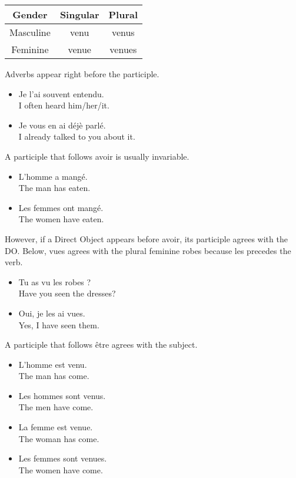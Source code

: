 \begin{center}\begin{tabular}{|c|c|c|}
\hline
\textbf{Gender} & \textbf{Singular} & \textbf{Plural} \\ \hline
Masculine       & venu              & venus           \\ \hline
Feminine        & venue             & venues          \\ \hline
\end{tabular}\end{center}

Adverbs appear right before the participle.

\begin{itemize}
  \item  Je l'ai souvent entendu. \\ I often heard him/her/it.
	\item  Je vous en ai d{\'e}j{\`e} parl{\'e}. \\ I already talked to you about it.
\end{itemize}

A participle that follows avoir is usually invariable.

\begin{itemize}
  \item  L'homme a mang{\'e}. \\ The man has eaten.
	\item  Les femmes ont mang{\'e}. \\ The women have eaten.
\end{itemize}

However, if a Direct Object appears before avoir, its participle agrees with the DO. Below, vues agrees with the plural feminine robes because les precedes the verb.

\begin{itemize}
  \item  Tu as vu les robes ? \\ Have you seen the dresses?
	\item  Oui, je les ai vues. \\ Yes, I have seen them.
\end{itemize}

A participle that follows {\^e}tre agrees with the subject.

\begin{itemize}
  \item  L'homme est venu. \\ The man has come.
	\item  Les hommes sont venus. \\ The men have come.
	\item  La femme est venue. \\ The woman has come.
	\item  Les femmes sont venues. \\ The women have come.
\end{itemize}

